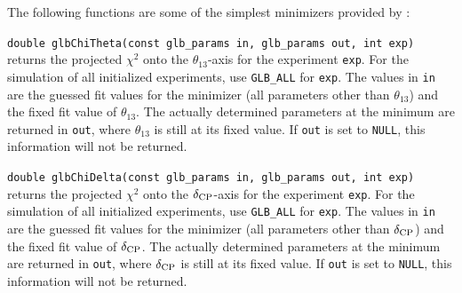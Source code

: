 The following functions are some of the simplest minimizers 
provided by \GLOBES :
\begin{function}
{\tt double glbChiTheta(const glb\_params in, glb\_params out, int exp)}
returns the projected $\chi^2$ onto the $\theta_{13}$-axis for the  experiment {\tt exp}. For the simulation of all initialized experiments,
use {\tt GLB\_ALL} for {\tt exp}. The values in {\tt in} are the guessed fit values for the minimizer (all parameters other than $\theta_{13}$) and the fixed fit value of $\theta_{13}$. The actually determined parameters at the minimum are returned in {\tt out}, where $\theta_{13}$ is still at
its fixed value. If {\tt out} is set to {\tt NULL}, this information will not be returned.
\end{function}
\begin{function}
{\tt double glbChiDelta(const glb\_params in, glb\_params out, int exp)}
returns the projected $\chi^2$ onto the $\delta_{\mathrm{CP}}$-axis for the  experiment {\tt exp}. For the simulation of all initialized experiments,
use {\tt GLB\_ALL} for {\tt exp}. The values in {\tt in} are the guessed fit values for the minimizer (all parameters other than $\delta_{\mathrm{CP}}$) and the fixed fit value of $\delta_{\mathrm{CP}}$. The actually determined parameters at the minimum are returned in {\tt out}, where $\delta_{\mathrm{CP}}$ is still at its fixed value. If {\tt out} is set to {\tt NULL}, this information will not be returned.
\end{function}

